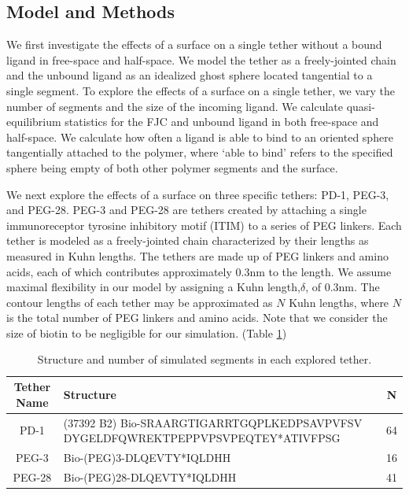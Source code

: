 \documentclass[../../AdvancementSummary.tex]{subfiles}
\begin{document}
\subsection{Model and Methods}

We first investigate the effects of a surface on a single tether without a bound ligand in free-space and half-space. We model the tether as a freely-jointed chain and the unbound ligand as an idealized ghost sphere located tangential to a single segment. To explore the effects of a surface on a single tether, we vary the number of segments and the size of the incoming ligand. We calculate quasi-equilibrium statistics for the FJC and unbound ligand in both free-space and half-space. We calculate how often a ligand is able to bind to an oriented sphere tangentially attached to the polymer, where `able to bind' refers to the specified sphere being empty of both other polymer segments and the surface. 

We next explore the effects of a surface on three specific tethers: PD-1, PEG-3, and PEG-28. PEG-3 and PEG-28 are tethers created by attaching a single immunoreceptor tyrosine inhibitory motif (ITIM) to a series of PEG linkers. Each tether is modeled as a freely-jointed chain characterized by their lengths as measured in Kuhn lengths. The tethers are made up of PEG linkers and amino acids, each of which contributes approximately 0.3nm to the length. We assume maximal flexibility in our model by assigning a Kuhn length,$\delta$, of 0.3nm. The contour lengths of each tether may be approximated as $N$ Kuhn lengths, where $N$ is the total number of PEG linkers and amino acids. Note that we consider the size of biotin to be negligible for our simulation. (Table \ref{table: Tethers})

\begin{table}
\caption{Structure and number of simulated segments in each explored tether. \label{table: Tethers}}
\begin{center}
\begin{tabular}{| c | p{10cm} | c |}
    \hline
        Tether Name & Structure & N \\ 
        \hline 
        PD-1    &   (37392 B2) Bio-SRAARGTIGARRTGQPLKEDPSAVPVFSV
                    DYGELDFQWREKTPEPPVPSVPEQTEY*ATIVFPSG            &   64   \\
        PEG-3   &   Bio-(PEG)3-DLQEVTY*IQLDHH                           &   16   \\ 
        PEG-28  &   Bio-(PEG)28-DLQEVTY*IQLDHH                          &   41   \\
    \hline
\end{tabular}
\end{center}
\end{table}
\end{document}
